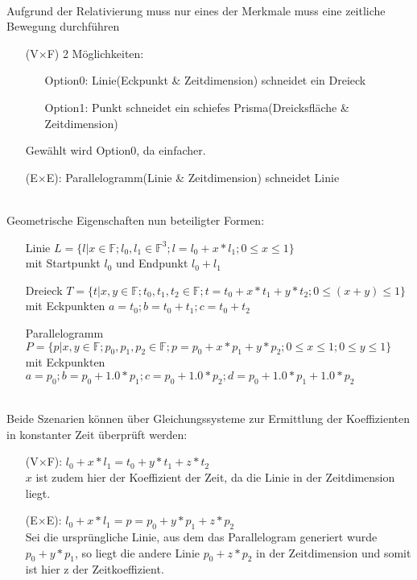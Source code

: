 \begin{itemize}
\begin{itemize}
		\end{itemize}
\ \\
		Aufgrund der Relativierung muss nur eines der Merkmale muss eine zeitliche Bewegung durchführen
		\begin{itemize}
			\item [(V$\times$F)] 2 Möglichkeiten:
				\begin{itemize}
					\item[Option0:] Linie(Eckpunkt \& Zeitdimension) schneidet ein Dreieck
					\item[Option1:] Punkt schneidet ein schiefes Prisma(Dreicksfläche \& Zeitdimension)
				\end{itemize}
				Gewählt wird Option0, da einfacher.
			\item [(E$\times$E):]  Parallelogramm(Linie \& Zeitdimension) schneidet Linie
		\end{itemize}
\ \\
		Geometrische Eigenschaften nun beteiligter Formen:
		\begin{itemize}
			\item [Linie] $L = \{l | x\in\mathbb{F} ; l_0, l_1 \in \mathbb{F}^3 ; l = l_0 + x * l_1; 0\le x\le 1 \}$ \\
			mit Startpunkt $l_0$ und Endpunkt $l_0 + l_1$
		\item [Dreieck] $T = \{t | x,y \in\mathbb{F}; t_0, t_1, t_2 \in \mathbb{F}; t = t_0 + x*t_1 + y*t_2; 0\le (x+y) \le 1\}$\\
			mit Eckpunkten $a = t_0 ; b = t_0 + t_1 ; c = t_0 + t_2$ 
			\item [Parallelogramm] $P = \{p | x,y \in\mathbb{F}; p_0, p_1, p_2 \in \mathbb{F}; p = p_0 + x*p_1 + y*p_2; 0\le x\le 1; 0\le y\le 1\}$\\
			mit Eckpunkten $a = p_0 ; b = p_0 + 1.0*p_1 ; c = p_0 + 1.0*p_2; d = p_0 + 1.0*p_1 + 1.0*p_2$ 
		\end{itemize}
\ \\
		Beide Szenarien können über Gleichungssysteme zur Ermittlung der Koeffizienten in konstanter Zeit überprüft werden:
		\begin{itemize}
			\item [(V$\times$F):] $l_0 + x * l_1 = t_0 + y*t_1 + z*t_2$\\
				$x$ ist zudem hier der Koeffizient der Zeit, da die Linie in der Zeitdimension liegt.
			\item [(E$\times$E):] $l_0 + x * l_1 = p = p_0 + y*p_1 + z*p_2$\\
				Sei die ursprüngliche Linie, aus dem das Parallelogram generiert wurde $p_0+y*p_1$, so liegt die andere Linie $p_0 + z*p_2$ in der Zeitdimension und somit ist hier z der Zeitkoeffizient.

\end{itemize}
\end{itemize}
